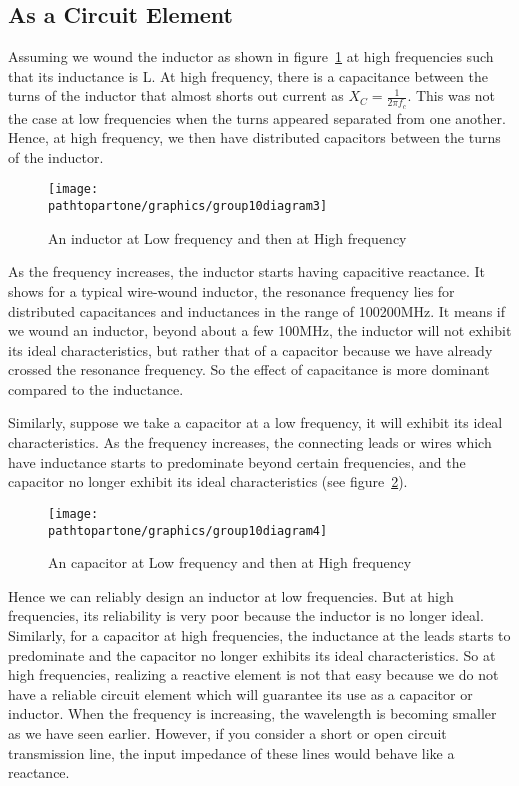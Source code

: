 \subsection{As a Circuit Element}\label{sec:circuitelement}
Assuming we wound the inductor as shown in figure~\ref{fig:group10diagram3} at high frequencies such that its inductance is L. At high frequency, there is a capacitance between the turns of the inductor that almost shorts out current as $X_{C} = \frac{1}{2\pi f_c}$. This was not the case at low frequencies when the turns appeared separated from one another. Hence, at high frequency, we then have distributed capacitors between the turns of the inductor.
\begin{figure}[h]
\centering
\texttt{[image: \\pathtopartone/graphics/group10diagram3]}
\caption{An inductor at Low frequency and then at High frequency}
\label{fig:group10diagram3}
\end{figure}

As the frequency increases, the inductor starts having capacitive reactance. It shows for a typical wire-wound inductor, the resonance frequency lies for distributed capacitances and inductances in the range of 100\textemdash\;200MHz. It means if we wound an inductor, beyond about a few 100MHz, the inductor will not exhibit its ideal characteristics, but rather that of a capacitor because we have already crossed the resonance frequency. So the effect of capacitance is more dominant compared to the inductance.

Similarly, suppose we take a capacitor at a low frequency, it will exhibit its ideal characteristics. As the frequency increases, the connecting leads or wires which have inductance starts to predominate beyond certain frequencies, and the capacitor no longer exhibit its ideal characteristics (see figure~\ref{fig:group10diagram4}).
\begin{figure}[h]
\centering
\texttt{[image: \\pathtopartone/graphics/group10diagram4]}
\caption{An capacitor at Low frequency and then at High frequency}
\label{fig:group10diagram4}
\end{figure}

Hence we can reliably design an inductor at low frequencies. But at high frequencies, its reliability is very poor because the inductor is no longer ideal. Similarly, for a capacitor at high frequencies, the inductance at the leads starts to predominate and the capacitor no longer exhibits its ideal characteristics. So at high frequencies, realizing a reactive element is not that easy because we do not have a reliable circuit element which will guarantee its use as a capacitor or inductor. When the frequency is increasing, the wavelength is becoming smaller as we have seen earlier. 
However, if you consider a short or open circuit transmission line, the input impedance of these lines would behave like a reactance.


